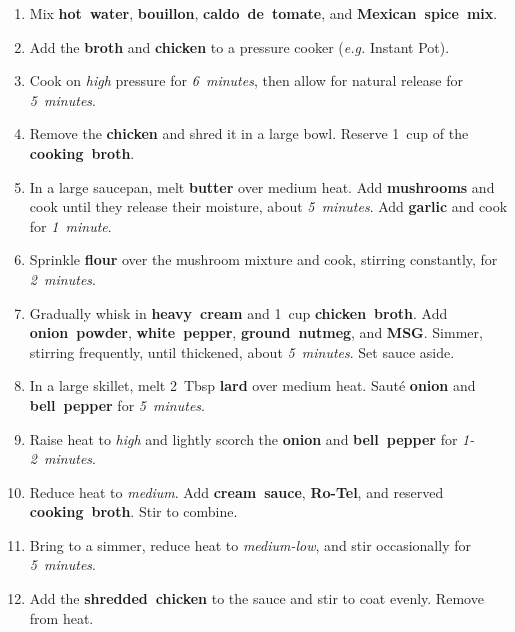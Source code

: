 \documentclass[11pt,letterpaper]{article}
\begin{document}
\begin{enumerate}
    \item Mix \textbf{hot~water}, \textbf{bouillon}, \textbf{caldo~de~tomate}, and \textbf{Mexican~spice~mix}.
    
    \item Add the \textbf{broth} and \textbf{chicken} to a pressure cooker (\textit{e.g.} Instant Pot).
    
    \item Cook on \textit{high} pressure for \textit{6~minutes}, then allow for natural release for \textit{5~minutes}.
    
    \item Remove the \textbf{chicken} and shred it in a large bowl. Reserve 1~cup of the \textbf{cooking~broth}.
    
    \item In a large saucepan, melt \textbf{butter} over medium heat. Add \textbf{mushrooms} and cook until they release their moisture, about \textit{5~minutes}. Add \textbf{garlic} and cook for \textit{1~minute}.
    
    \item Sprinkle \textbf{flour} over the mushroom mixture and cook, stirring constantly, for \textit{2~minutes}.
    
    \item Gradually whisk in \textbf{heavy~cream} and 1~cup \textbf{chicken~broth}. Add \textbf{onion~powder}, \textbf{white~pepper}, \textbf{ground~nutmeg}, and \textbf{MSG}. Simmer, stirring frequently, until thickened, about \textit{5~minutes}. Set sauce aside.
    
    \item In a large skillet, melt 2~Tbsp \textbf{lard} over medium heat. Sauté \textbf{onion} and \textbf{bell~pepper} for \textit{5~minutes}.
    
    \item Raise heat to \textit{high} and lightly scorch the \textbf{onion} and \textbf{bell~pepper} for \textit{1-2~minutes}.
    
    \item Reduce heat to \textit{medium}. Add \textbf{cream~sauce}, \textbf{Ro-Tel}, and reserved \textbf{cooking~broth}. Stir to combine.
    
    \item Bring to a simmer, reduce heat to \textit{medium-low}, and stir occasionally for \textit{5~minutes}.
    
    \item Add the \textbf{shredded~chicken} to the sauce and stir to coat evenly. Remove from heat.
    

\end{enumerate}
\end{document}

